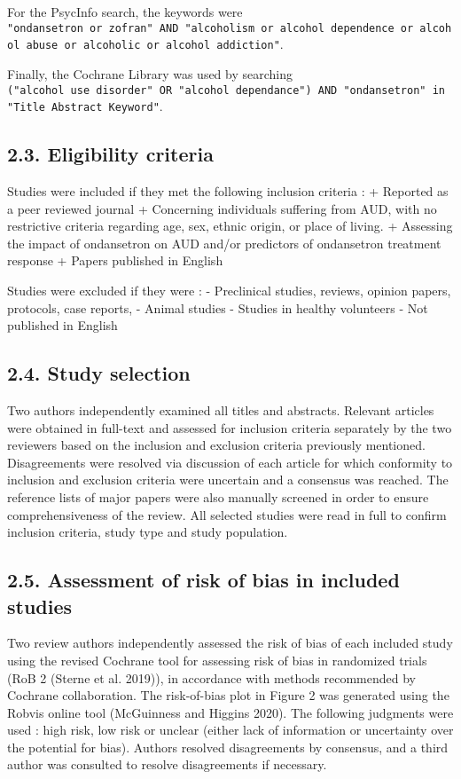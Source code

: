 \documentclass[
  12pt,
]{article}
\begin{document}
For the PsycInfo search, the keywords were
\texttt{"ondansetron\ or\ zofran"\ AND\ "alcoholism\ or\ alcohol\ dependence\ or\ alcohol\ abuse\ or\ alcoholic\ or\ alcohol\ addiction"}.

Finally, the Cochrane Library was used by searching
\texttt{("alcohol\ use\ disorder"\ OR\ "alcohol\ dependance")\ AND\ "ondansetron"\ in\ "Title\ Abstract\ Keyword"}.

\subsection{2.3. Eligibility criteria}\label{eligibility-criteria}

Studies were included if they met the following inclusion criteria : +
Reported as a peer reviewed journal + Concerning individuals suffering
from AUD, with no restrictive criteria regarding age, sex, ethnic
origin, or place of living. + Assessing the impact of ondansetron on AUD
and/or predictors of ondansetron treatment response + Papers published
in English

Studies were excluded if they were : - Preclinical studies, reviews,
opinion papers, protocols, case reports, - Animal studies - Studies in
healthy volunteers - Not published in English

\subsection{2.4. Study selection}\label{study-selection}

Two authors independently examined all titles and abstracts. Relevant
articles were obtained in full-text and assessed for inclusion criteria
separately by the two reviewers based on the inclusion and exclusion
criteria previously mentioned. Disagreements were resolved via
discussion of each article for which conformity to inclusion and
exclusion criteria were uncertain and a consensus was reached. The
reference lists of major papers were also manually screened in order to
ensure comprehensiveness of the review. All selected studies were read
in full to confirm inclusion criteria, study type and study population.

\subsection{2.5. Assessment of risk of bias in included
studies}\label{assessment-of-risk-of-bias-in-included-studies}

Two review authors independently assessed the risk of bias of each
included study using the revised Cochrane tool for assessing risk of
bias in randomized trials (RoB 2 (Sterne et al. 2019)), in accordance
with methods recommended by Cochrane collaboration. The risk-of-bias
plot in Figure 2 was generated using the Robvis online tool (McGuinness
and Higgins 2020). The following judgments were used : high risk, low
risk or unclear (either lack of information or uncertainty over the
potential for bias). Authors resolved disagreements by consensus, and a
third author was consulted to resolve disagreements if necessary.
\end{document}
